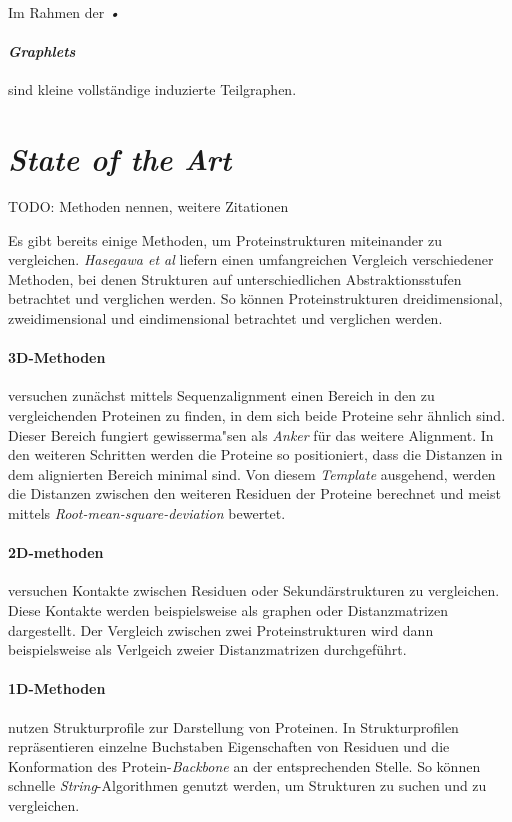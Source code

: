 \documentclass{report}
\begin{document}
Im Rahmen der \textit{•}




\paragraph{\textit{Graphlets}} sind kleine vollst\"andige induzierte Teilgraphen.






\section{\textit{State of the Art}}

TODO: Methoden nennen, weitere Zitationen

Es gibt bereits einige Methoden, um Proteinstrukturen miteinander zu vergleichen. \textit{Hasegawa et al} \cite{advancespitfalls} liefern einen umfangreichen Vergleich verschiedener Methoden, bei denen Strukturen auf unterschiedlichen Abstraktionsstufen betrachtet und verglichen werden. So k\"onnen Proteinstrukturen dreidimensional, zweidimensional und eindimensional betrachtet und verglichen werden.

\paragraph{3D-Methoden} versuchen zun\"achst mittels Sequenzalignment einen Bereich in den zu vergleichenden Proteinen zu finden, in dem sich beide Proteine sehr \"ahnlich sind. Dieser Bereich fungiert gewisserma"sen als \emph{Anker} f\"ur das weitere Alignment. In den weiteren Schritten werden die Proteine so positioniert, dass die Distanzen in dem alignierten Bereich minimal sind. Von diesem \textit{Template} ausgehend, werden die Distanzen zwischen den weiteren Residuen der Proteine berechnet und meist mittels \textit{Root-mean-square-deviation} bewertet.

\paragraph{2D-methoden} versuchen Kontakte zwischen Residuen oder Sekund\"arstrukturen zu vergleichen. Diese Kontakte werden beispielsweise als graphen oder Distanzmatrizen dargestellt. Der Vergleich zwischen zwei Proteinstrukturen wird dann beispielsweise als Verlgeich zweier Distanzmatrizen durchgef\"uhrt.

\paragraph{1D-Methoden} nutzen Strukturprofile zur Darstellung von Proteinen. In Strukturprofilen repr\"asentieren einzelne Buchstaben Eigenschaften von Residuen und die Konformation des Protein-\textit{Backbone} an der entsprechenden Stelle. So k\"onnen schnelle \textit{String}-Algorithmen genutzt werden, um Strukturen zu suchen und zu vergleichen.
\end{document}
